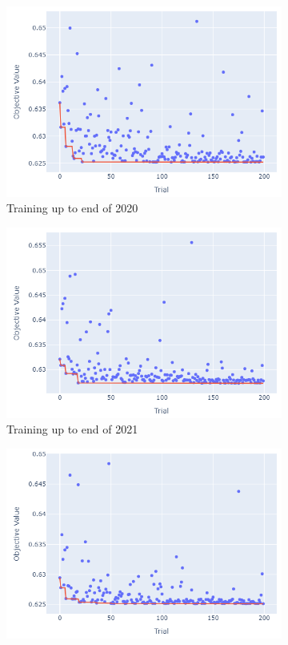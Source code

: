 \documentclass[12pt,twoside]{report}
\begin{document}
\begin{figure}[htb]
\begin{subfigure}{.33\linewidth}
  \includegraphics[width=0.95\linewidth]{figures/lr_no_odds_cutoff_2020.png}
  \caption{Training up to end of 2020}
\end{subfigure}%
\begin{subfigure}{.33\linewidth}
  \centering
  \includegraphics[width=0.95\linewidth]{figures/lr_no_odds_cutoff_2021.png}
  \caption{Training up to end of 2021}
\end{subfigure}
\par\bigskip
\par\bigskip
\begin{subfigure}{.33\linewidth}
  \centering
  \includegraphics[width=0.95\linewidth]{figures/lr_no_odds_cutoff_2022.png}

\end{subfigure}
\end{figure}
\end{document}
